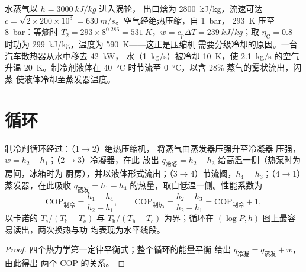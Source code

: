 \begin{example}[设备的数值计算]\label{ex:b2:open-systems:numbers}
水蒸气以 $h = \qty{3000}{kJ/kg}$ 进入涡轮，
出口焓为 \qty{2800}{kJ/kg}，流速可达 $c = \sqrt{2 \times 200 \times 10^3} =
\qty{630}{m/s}$。空气经绝热压缩，自 \qty{1}{bar}，
\qty{293}{K} 压至 \qty{8}{bar}：等熵时 $T_2 = 293 \times 8^{0.286} =
\qty{531}{K}$，$w = c_p\Delta T = \qty{239}{kJ/kg}$；取 $\eta_{\text{C}} =
0.8$ 时功为 \qty{299}{kJ/kg}，温度为 \qty{590}{K}——这正是压缩机
需要分级冷却的原因。一台汽车散热器从水中移去 \qty{42}{kW}，
水（\qty{1}{kg/s}）被冷却 \qty{10}{K}，使 \qty{2.1}{kg/s} 的空气
升温 \qty{20}{K}。制冷剂液体在 \qty{40}{\celsius} 时节流至
\qty{0}{\celsius}，以含 $28\%$ 蒸气的雾状流出，闪蒸
使液体冷却至蒸发器温度。
\end{example}

\section{循环}

\begin{proposition}[蒸气压缩制冷与热泵]\label{prop:b2:open-systems:fridge}
制冷剂循环经过：（1$\to$2）绝热压缩机，
将蒸气由蒸发器压强升至冷凝器
压强，$w = h_2 - h_1$；（2$\to$3）冷凝器，在此
放出 $q_{\text{冷凝}} = h_2 - h_3$ 给高温一侧（热泵时为房间，冰箱时为
厨房），并以液体形式流出；（3$\to$4）节流阀，$h_4
= h_3$；（4$\to$1）蒸发器，在此吸收 $q_{\text{蒸发}} = h_1 - h_4$
的热量，取自低温一侧。性能系数为
\[
\mathrm{COP}_{\text{制冷}} = \frac{h_1 - h_4}{h_2 - h_1}, \qquad
\mathrm{COP}_{\text{制热}} = \frac{h_2 - h_3}{h_2 - h_1} = \mathrm{COP}_{\text{制冷}} + 1 ,
\]
以卡诺的 $T_{\text{c}}/(T_{\text{h}} - T_{\text{c}})$ 与
$T_{\text{h}}/(T_{\text{h}} - T_{\text{c}})$ 为界；循环在
$(\log P, h)$ 图上最容易读出，两次换热与功
均表现为水平线段。
\end{proposition}

\begin{proof}
四个热力学第一定律平衡式；整个循环的能量平衡
给出 $q_{\text{冷凝}} = q_{\text{蒸发}} + w$，由此得出
两个 COP 的关系。
\end{proof}

